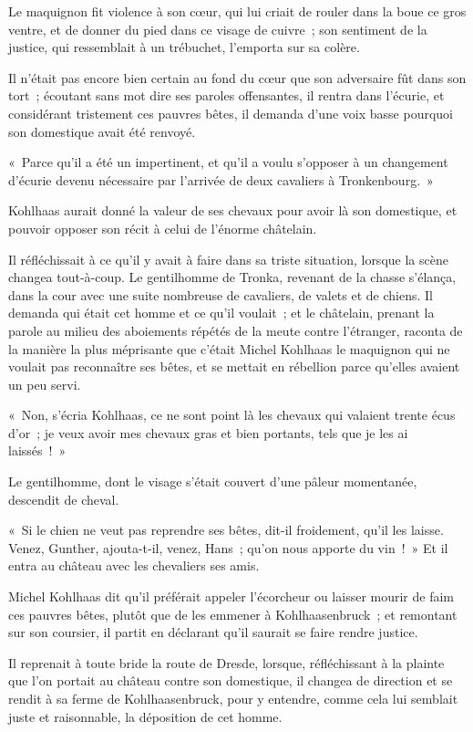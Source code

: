 \documentclass[french,twoside]{book} %
\begin{document}
Le maquignon fit violence à son cœur, qui lui criait de rouler dans la boue ce gros ventre, et de donner du pied dans ce visage de cuivre ; son sentiment de la justice, qui ressemblait à un trébuchet, l’emporta sur sa colère.\par
Il n’était pas encore bien certain au fond du cœur que son adversaire fût dans son tort ; écoutant sans mot dire ses paroles offensantes, il rentra dans l’écurie, et considérant tristement ces pauvres bêtes, il demanda d’une voix basse pourquoi son domestique avait été renvoyé.\par
« Parce qu’il a été un impertinent, et qu’il a voulu s’opposer à un changement d’écurie devenu nécessaire par l’arrivée de deux cavaliers à Tronkenbourg. »\par
Kohlhaas aurait donné la valeur de ses chevaux pour avoir là son domestique, et pouvoir opposer son récit à celui de l’énorme châtelain.\par
Il réfléchissait à ce qu’il y avait à faire dans sa triste situation, lorsque la scène changea tout-à-coup. Le gentilhomme de Tronka, revenant de la chasse s’élança, dans la cour avec une suite nombreuse de cavaliers, de valets et de chiens. Il demanda qui était cet homme et ce qu’il voulait ; et le châtelain, prenant la parole au milieu des aboiements répétés de la meute contre l’étranger, raconta de la manière la plus méprisante que c’était Michel Kohlhaas le maquignon qui ne voulait pas reconnaître ses bêtes, et se mettait en rébellion parce qu’elles avaient un peu servi.\par
« Non, s’écria Kohlhaas, ce ne sont point là les chevaux qui valaient trente écus d’or ; je veux avoir mes chevaux gras et bien portants, tels que je les ai laissés ! »\par
Le gentilhomme, dont le visage s’était couvert d’une pâleur momentanée, descendit de cheval.\par
« Si le chien ne veut pas reprendre ses bêtes, dit-il froidement, qu’il les laisse. Venez, Gunther, ajouta-t-il, venez, Hans ; qu’on nous apporte du vin ! » Et il entra au château avec les chevaliers ses amis.\par
Michel Kohlhaas dit qu’il préférait appeler l’écorcheur ou laisser mourir de faim ces pauvres bêtes, plutôt que de les emmener à Kohlhaasenbruck ; et remontant sur son coursier, il partit en déclarant qu’il saurait se faire rendre justice.\par
Il reprenait à toute bride la route de Dresde, lorsque, réfléchissant à la plainte que l’on portait au château contre son domestique, il changea de direction et se rendit à sa ferme de Kohlhaasenbruck, pour y entendre, comme cela lui semblait juste et raisonnable, la déposition de cet homme.\par
\end{document}
